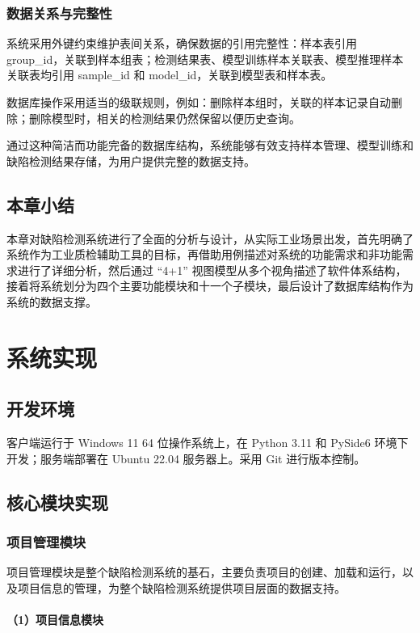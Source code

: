 \documentclass[
  ]{njuthesis}
\begin{document}
\subsection{数据关系与完整性}

系统采用外键约束维护表间关系，确保数据的引用完整性：样本表引用 group\_id，关联到样本组表；检测结果表、模型训练样本关联表、模型推理样本关联表均引用 sample\_id 和 model\_id，关联到模型表和样本表。

数据库操作采用适当的级联规则，例如：删除样本组时，关联的样本记录自动删除；删除模型时，相关的检测结果仍然保留以便历史查询。

通过这种简洁而功能完备的数据库结构，系统能够有效支持样本管理、模型训练和缺陷检测结果存储，为用户提供完整的数据支持。

\section{本章小结}

本章对缺陷检测系统进行了全面的分析与设计，从实际工业场景出发，首先明确了系统作为工业质检辅助工具的目标，再借助用例描述对系统的功能需求和非功能需求进行了详细分析，然后通过 “4+1” 视图模型从多个视角描述了软件体系结构，接着将系统划分为四个主要功能模块和十一个子模块，最后设计了数据库结构作为系统的数据支撑。

\chapter{系统实现}

\section{开发环境}

客户端运行于 Windows 11 64 位操作系统上，在 Python 3.11 和 PySide6 环境下开发；服务端部署在 Ubuntu 22.04 服务器上。采用 Git 进行版本控制。

\section{核心模块实现}

\subsection{项目管理模块}

项目管理模块是整个缺陷检测系统的基石，主要负责项目的创建、加载和运行，以及项目信息的管理，为整个缺陷检测系统提供项目层面的数据支持。

\subsubsection{（1）项目信息模块}
\end{document}
